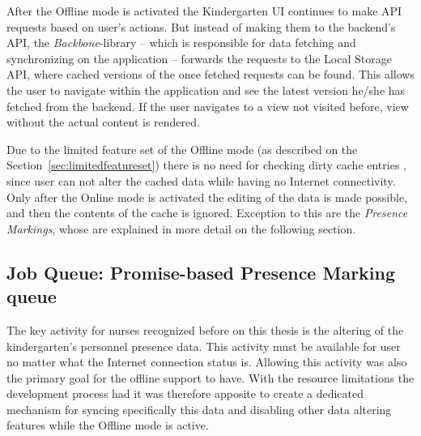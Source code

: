 After the Offline mode is activated the Kindergarten UI continues to make API requests based on user's actions. But instead of making them to the backend's API, the \textit{Backbone}-library – which is responsible for data fetching and synchronizing on the application – forwards the requests to the Local Storage API, where cached versions of the once fetched requests can be found. This allows the user to navigate within the application and see the latest version he/she has fetched from the backend. If the user navigates to a view not visited before, view without the actual content is rendered. 

Due to the limited feature set of the Offline mode (as described on the Section~\ref{sec:limitedfeatureset}) there is no need for checking dirty cache entries \cite[Page 138]{laplante_dictionary_2000}, since user can not alter the cached data while having no Internet connectivity. Only after the Online mode is activated the editing of the data is made possible, and then the contents of the cache is ignored. Exception to this are the \textit{Presence Markings}, whose are explained in more detail on the following section.










\subsection{Job Queue: Promise-based Presence Marking queue}
\label{subsec:jobqueue}


The key activity for nurses recognized before on this thesis is the altering of the kindergarten's personnel presence data. This activity must be available for user no matter what the Internet connection status is. Allowing this activity was also the primary goal for the offline support to have. With the resource limitations the development process had it was therefore apposite to create a dedicated mechanism for syncing specifically this data and disabling other data altering features while the Offline mode is active. %

